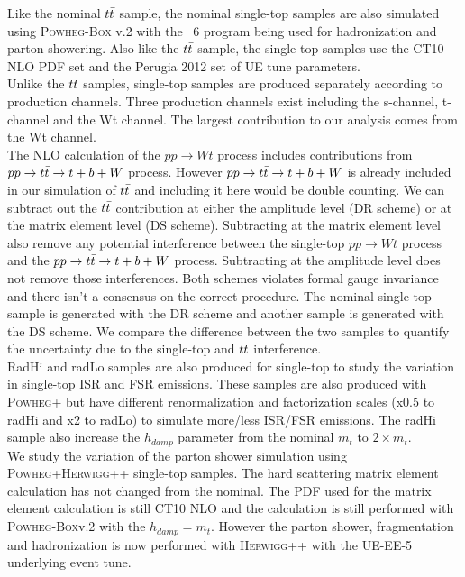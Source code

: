 \indent Like the nominal $t\bar{t}$ sample, the nominal single-top samples are also simulated using \textsc{Powheg-Box} v.2\cite{PowhegST_st,PowhegST_wt} with the \pythia~6 program being used for hadronization and parton showering.  Also like the $t\bar{t}$ sample, the single-top samples use the CT10 NLO PDF set and the Perugia 2012 set of UE tune parameters. \\

\indent Unlike the $t\bar{t}$ samples, single-top samples are produced separately according to production channels.  Three production channels exist including the s-channel, t-channel and the Wt channel.  The largest contribution to our analysis comes from the Wt channel.  \\

\indent The NLO calculation of the $pp \rightarrow Wt$ process includes contributions from $ pp \rightarrow t\bar{t} \rightarrow t + b + W$ process.  However $ pp \rightarrow t\bar{t} \rightarrow t + b + W$ is already included in our simulation of $t\bar{t}$ and including it here would be double counting.  We can subtract out the $t\bar{t}$ contribution at either the amplitude level (DR scheme) or at the matrix element level (DS scheme).  Subtracting at the matrix element level also remove any potential interference between the single-top $pp \rightarrow Wt$ process and the $ pp \rightarrow t\bar{t} \rightarrow t + b + W$ process.  Subtracting at the amplitude level does not remove those interferences.  Both schemes violates formal gauge invariance and there isn't a consensus on the correct procedure.  The nominal single-top sample is generated with the DR scheme and another sample is generated with the DS scheme.  We compare the difference between the two samples to quantify the uncertainty due to the single-top and $t\bar{t}$ interference. \\

\indent RadHi and radLo samples are also produced for single-top to study the variation in single-top ISR and FSR emissions.  These samples are also produced with \textsc{Powheg+} but have different renormalization and factorization scales (x0.5 to radHi and x2 to radLo) to simulate more/less ISR/FSR emissions. The radHi sample also increase the $h_{damp}$ parameter from the nominal $m_{t}$ to $2 \times m_{t}$. \\

\indent We study the variation of the parton shower simulation using \textsc{Powheg+Herwigg++} single-top samples.  The hard scattering matrix element calculation has not changed from the nominal.  The PDF used for the matrix element calculation is still CT10 NLO and the calculation is still performed with \textsc{Powheg-Box}v.2 with the $h_{damp} = m_{t}$.  However the parton shower, fragmentation and hadronization is now performed with \textsc{Herwigg++} with the UE-EE-5 underlying event tune.\cite{CTEQ6L1} \\

